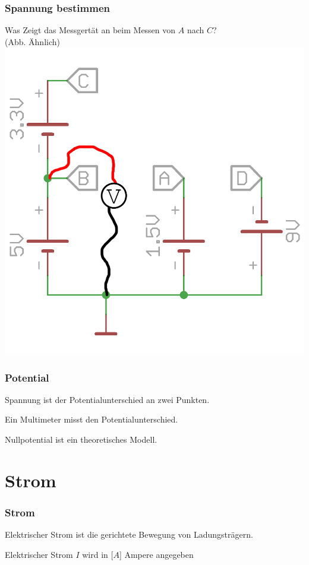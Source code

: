 \begin{frame}
    \frametitle{Spannung bestimmen}
    \begin{center}
    Was Zeigt das Messgertät an beim Messen von $A$ nach $C$?\\
    (Abb. Ähnlich)
        \includegraphics[width=.4\textwidth]{e02/SpannungMess.png}
    \end{center}
\end{frame}

\begin{frame}
    \frametitle{Potential}
    \begin{block}{}
      Spannung ist der Potentialunterschied an zwei Punkten.
    \end{block}
    \begin{block}{}
      Ein Multimeter misst den Potentialunterschied.
    \end{block}
    \begin{block}{}
      Nullpotential ist ein theoretisches Modell.
    \end{block}
\end{frame}

\section*{Strom}

\begin{frame}
    \frametitle{Strom}
    \begin{center}
    \begin{block}{}
        Elektrischer Strom ist die gerichtete Bewegung von Ladungsträgern.
    \end{block}
    \begin{block}{}
        Elektrischer Strom $I$ wird in [$A$] Ampere angegeben
    \end{block}
    \end{center}
\end{frame}

